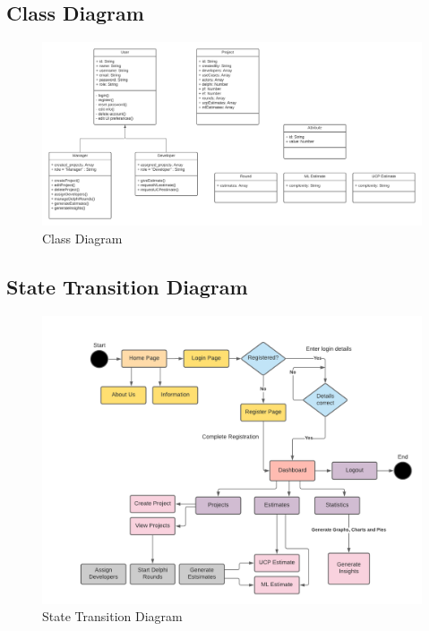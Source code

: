 




\subsection{Class Diagram}
\begin{figure}[H]
    \centering
    \includegraphics[scale=0.5]{./diagrams/class-diagram.png}
    \caption{Class Diagram}
    \label{fig:class-diag}
\end{figure}







% 

\subsection{State Transition Diagram}
\begin{figure}[H]
    \centering
    \includegraphics[scale=0.7]{./diagrams/state-transition.png}
    \caption{State Transition Diagram}
    \label{fig:state-transition}
\end{figure}


